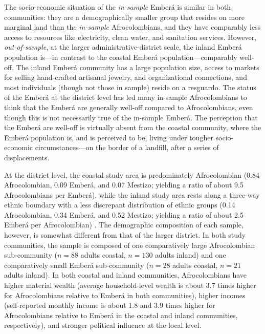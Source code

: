 \documentclass[bibauthoryear]{aa}
\begin{document}
The socio-economic situation of the \emph{in-sample} Ember\'a is similar in both communities: they are a demographically smaller group that resides on more marginal land than the \emph{in-sample} Afrocolombians, and they have comparably less access to resources like electricity, clean water, and sanitation services.  However,  \emph{out-of-sample}, at the larger administrative-district scale, the inland Ember\'a population is---in contrast to the coastal Ember\'a population---comparably well-off.  The inland Ember\'a community has a large population size, access to markets for selling hand-crafted artisanal jewelry,  and organizational connections, and most individuals (though not those in sample) reside on a resguardo.  The status of the Ember\'a at the district level has led many in-sample Afrocolombians to think that the Ember\'a are generally well-off compared to Afrocolombians, even though this is not necessarily true of the in-sample Ember\'a. The perception that the Ember\'a are well-off is virtually absent from the coastal community, where the Ember\'a population is, and is  perceived to be, living under tougher  socio-economic circumstances---on the border of a landfill, after a series of displacements.

At the district level, the coastal study area is predominately Afrocolombian (0.84 Afrocolombian, 0.09 Ember\'a, and 0.07 Mestizo; yielding a ratio of about 9.5 Afrocolombians per Ember\'a), while the inland study area rests along a three-way ethnic boundary with a less discrepant distribution of ethnic groups (0.14 Afrocolombian, 0.34 Ember\'a, and 0.52 Mestizo; yielding a ratio of about 2.5 Ember\'a per Afrocolombian) \citep{DAN051}. The demographic composition of each sample, however, is somewhat different from that of the larger district. In both study communities, the sample is composed of one comparatively large Afrocolombian sub-community ($n=88$ adults coastal, $n=130$ adults inland) and one comparatively small Ember\'a sub-community  ($n=28$ adults coastal, $n=21$ adults inland). In both coastal and inland communities, Afrocolombians have higher material wealth (average household-level wealth is about 3.7 times higher for Afrocolombians relative to Ember\'a in both communities), higher incomes (self-reported monthly income is about 1.8 and 3.9 times higher for Afrocolombians relative to Ember\'a in the coastal and inland communities, respectively), and stronger political influence at the local level. %
\end{document}
